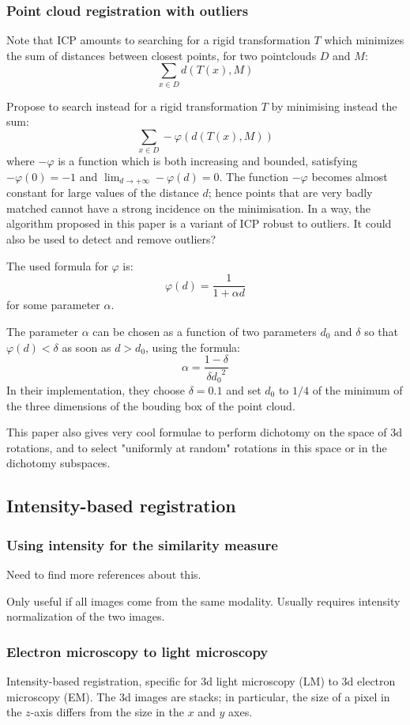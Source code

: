 \documentclass[11pt]{article} %
\begin{document}
    \subsubsection{Point cloud registration with outliers \cite{papazov:rotations}}
Note that ICP amounts to searching for a rigid transformation $T$ which minimizes the sum of distances between closest points, for two pointclouds $D$ and $M$:
$$\sum_{x \in D} d(T(x),M)$$

Propose to search instead for a rigid transformation $T$ by minimising instead the sum: $$\sum_{x \in D}-\varphi(d(T(x), M))$$
where $-\varphi$ %
is a function which is both increasing and bounded, satisfying $-\varphi(0) = -1$ and $\lim_{d \rightarrow +\infty} -\varphi(d) = 0$. The function $-\varphi$ becomes almost constant for large values of the distance $d$; hence points that are very badly matched cannot have a strong incidence on the minimisation. In a way, the algorithm proposed in this paper is a variant of ICP robust to outliers. It could also be used to detect and remove outliers?

The used formula for $\varphi$ is:
$$\varphi(d) = \frac{1}{1+\alpha d}$$
for some parameter $\alpha$.

The parameter $\alpha$ can be chosen as a function of two parameters $d_0$ and $\delta$ so that $\varphi(d) < \delta$ as soon as $d > d_0$, using the formula:
$$\alpha = \frac{1-\delta}{\delta {d_0}^2}$$
In their implementation, they choose $\delta = 0.1$ and set $d_0$ to $1/4$ of the minimum of the three dimensions of the bouding box of the point cloud.

This paper also gives very cool formulae to perform dichotomy on the space of 3d rotations, and to select "uniformly at random" rotations in this space or in the dichotomy subspaces.

  \subsection{Intensity-based registration}
    \subsubsection{Using intensity for the similarity measure}
Need to find more references about this.

Only useful if all images come from the same modality. Usually requires intensity normalization of the two images.
    \subsubsection{Electron microscopy to light microscopy \cite{acosta:intensity}}
Intensity-based registration, specific for 3d light microscopy (LM) to 3d electron microscopy (EM). The 3d images are stacks; in particular, the size of a pixel in the $z$-axis differs from the size in the $x$ and $y$ axes.
\end{document}
